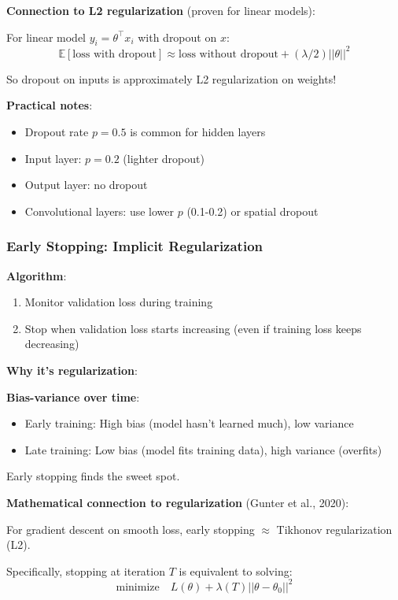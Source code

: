 \textbf{Connection to L2 regularization} (proven for linear models):

For linear model $y_i = \theta^\top x_i$ with dropout on $x$:
\begin{equation}
\mathbb{E}[\text{loss with dropout}] \approx \text{loss without dropout} + (\lambda/2)||\theta||^2
\end{equation}

So dropout on inputs is approximately L2 regularization on weights!

\textbf{Practical notes}:
\begin{itemize}
    \item Dropout rate $p = 0.5$ is common for hidden layers
    \item Input layer: $p = 0.2$ (lighter dropout)
    \item Output layer: no dropout
    \item Convolutional layers: use lower $p$ (0.1-0.2) or spatial dropout
\end{itemize}

\subsubsection{Early Stopping: Implicit Regularization}

\textbf{Algorithm}:
\begin{enumerate}
    \item Monitor validation loss during training
    \item Stop when validation loss starts increasing (even if training loss keeps decreasing)
\end{enumerate}

\textbf{Why it's regularization}:

\textbf{Bias-variance over time}:
\begin{itemize}
    \item Early training: High bias (model hasn't learned much), low variance
    \item Late training: Low bias (model fits training data), high variance (overfits)
\end{itemize}

Early stopping finds the sweet spot.

\textbf{Mathematical connection to regularization} (Gunter et al., 2020):

For gradient descent on smooth loss, early stopping $\approx$ Tikhonov regularization (L2).

Specifically, stopping at iteration $T$ is equivalent to solving:
\begin{equation}
\text{minimize} \quad L(\theta) + \lambda(T)||\theta - \theta_0||^2
\end{equation}

